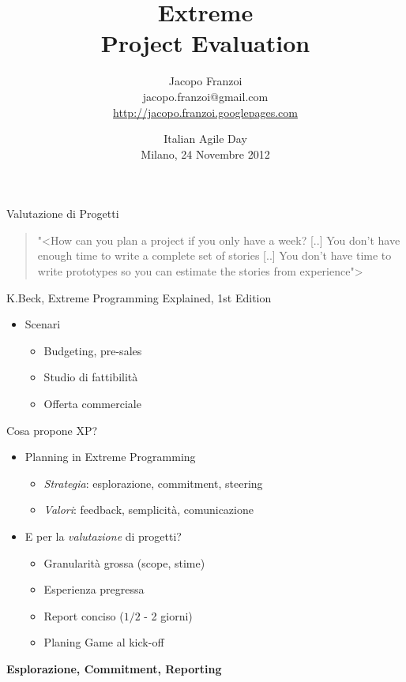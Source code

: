 \documentclass[compress, red, 14pt, pdf]{beamer}
\title{ Extreme \\ Project Evaluation }
\author{
	Jacopo Franzoi \\
	{\scriptsize jacopo.franzoi@gmail.com } \\
	{\scriptsize \href{http://jacopo.franzoi.googlepages.com/}{http://jacopo.franzoi.googlepages.com} \\ }
}
\date{
	Italian Agile Day \\
	Milano, 24 Novembre 2012
}
\newcommand{\highlight}[1]{{\color{purple} \emph{#1}}}
\begin{document}
	\begin{frame}
		\titlepage
	\end{frame}	

	\begin{frame}{Valutazione di Progetti}
		\begin{quote}
			{\small "<{How can you plan a project if you only have a week? [..] You don't have enough time to write a complete set of stories [..] You don't have time to write prototypes so you can estimate the stories from experience}">}
		\end{quote}
		\hfill {\scriptsize K.Beck, Extreme Programming Explained, 1st Edition}

		\begin{itemize}
			\item Scenari
			\begin{itemize}
				\item Budgeting, pre-sales
				\item Studio di fattibilità
				\item Offerta commerciale
			\end{itemize}
		\end{itemize}
	\end{frame}


	\begin{frame}{Cosa propone XP?}
		\begin{itemize}
			\item Planning in Extreme Programming
			\begin{itemize}
				\item \highlight{Strategia}: esplorazione, commitment, steering
				\item \highlight{Valori}: feedback, semplicità, comunicazione
			\end{itemize}
		\end{itemize}

		\begin{itemize}
			\item E per la \highlight{valutazione} di progetti?
			\begin{itemize}
				\item Granularità grossa (scope, stime)
				\item Esperienza pregressa
				\item Report conciso ($1/2$ - 2 giorni)
				\item Planing Game al kick-off
			\end{itemize}
		\end{itemize}
		
		\begin{center}
			\textbf{Esplorazione, Commitment, Reporting}
		\end{center}
	\end{frame}
\end{document}
